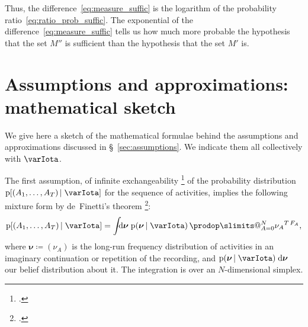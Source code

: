 \documentclass[\ifafour a4paper,12pt,\else a5paper,10pt,\fi%
onecolumn,oneside,article,%
british%
]{memoir}
\makeatletter
\theoremstyle{remark}
\theoremstyle{innote}
\def\prod{\DOTSI\prodop\slimits@}
\newcommand*{\citep}{\footcites}
\newcommand*{\di}{\mathrm{d}}%
\newcommand*{\defd}{\coloneqq}
\newcommand*{\pf}{\mathrm{p}}%
\renewcommand*{\|}{\nonscript\,\vert\nonscript\;\mathopen{}}
\newcommand*{\sect}{\S}%
\newcommand*{\chap}{ch.}%
\newcommand*{\yAv}{A}
\newcommand*{\yFF}{F}
\newcommand*{\yF}{\bm{\yFF}}
\newcommand*{\yA}{\yAv}%
\newcommand*{\yI}{\varIota}
\newcommand*{\ynuu}{\nu}
\newcommand*{\ynu}{\bm{\ynuu}}
\newcommand*{\pxxx}{P}
\newcommand*{\sh}{\mathrm{\varEta}}
\makeatother
\begin{document}
Thus, the difference~\eqref{eq:measure_suffic} is the logarithm of the
probability ratio~\eqref{eq:ratio_prob_suffic}. The exponential of the
difference~\eqref{eq:measure_suffic} tells us how much more probable the
hypothesis that the set $M''$ is sufficient than the hypothesis that the
set $M'$ is.

\section{Assumptions and approximations: mathematical sketch}
\label{sec:inference_prob}

We give here a sketch of the mathematical formulae behind the assumptions
and approximations discussed in \sect~\ref{sec:assumptions}. We indicate
them all collectively with $\yI$.

The first assumption, of infinite exchangeability
\citep[\chap~4]{bernardoetal1994_r2000}{dawid2013} of the probability
distribution $\pf[(\yA_{1},\dotsc, \yA_{T}) \| \yI]$ for the sequence of
activities, implies the following mixture form by de~Finetti's theorem
\citep{definetti1930,hewittetal1955}:
\begin{equation}
  \label{eq:mixture_from_definetti}
  \pf[(\yA_{1},\dotsc, \yA_{T}) \| \yI]
  = \int\!\!\!\di\ynu\;\pf(\ynu \|\yI)\,\prod_{\yA=0}^{N}{\nu_{\yA}}^{T\,\yFF_{\yA}},
\end{equation}
where $\ynu\defd(\nu_{\yA})$ is the long-run frequency distribution of
activities in an imaginary continuation or repetition of the recording, and
$\pf(\ynu \|\yI)\;\di\ynu$ our belief distribution about it. The
integration is over an $N$-dimensional simplex.
\end{document}
